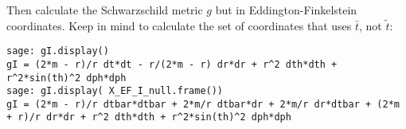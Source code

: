 Then calculate the Schwarzschild metric $g$ but in Eddington-Finkelstein coordinates.  Keep in mind to calculate the set of coordinates that uses $\bar{t}$, not $\widetilde{t}$: 

\begin{lstlisting}[frame=single]
sage: gI.display()
gI = (2*m - r)/r dt*dt - r/(2*m - r) dr*dr + r^2 dth*dth + r^2*sin(th)^2 dph*dph
sage: gI.display( X_EF_I_null.frame())
gI = (2*m - r)/r dtbar*dtbar + 2*m/r dtbar*dr + 2*m/r dr*dtbar + (2*m + r)/r dr*dr + r^2 dth*dth + r^2*sin(th)^2 dph*dph
\end{lstlisting}



